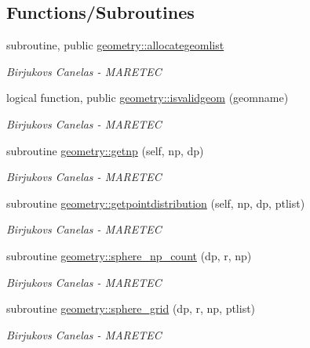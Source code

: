 \subsection*{Functions/\+Subroutines}
\begin{DoxyCompactItemize}
\item 
subroutine, public \hyperlink{namespacegeometry_a17652db20fde3f883b4fc778e0e6cdda}{geometry\+::allocategeomlist}
\begin{DoxyCompactList}\small\item\em Birjukovs Canelas -\/ M\+A\+R\+E\+T\+EC \end{DoxyCompactList}\item 
logical function, public \hyperlink{namespacegeometry_a56488a00edf7ba4e670ceffd5c36f13f}{geometry\+::isvalidgeom} (geomname)
\begin{DoxyCompactList}\small\item\em Birjukovs Canelas -\/ M\+A\+R\+E\+T\+EC \end{DoxyCompactList}\item 
subroutine \hyperlink{namespacegeometry_ad14d7800ac13b9a6722ac96b06ce94c9}{geometry\+::getnp} (self, np, dp)
\begin{DoxyCompactList}\small\item\em Birjukovs Canelas -\/ M\+A\+R\+E\+T\+EC \end{DoxyCompactList}\item 
subroutine \hyperlink{namespacegeometry_a726dae6e63f052138bd3346de439fbc4}{geometry\+::getpointdistribution} (self, np, dp, ptlist)
\begin{DoxyCompactList}\small\item\em Birjukovs Canelas -\/ M\+A\+R\+E\+T\+EC \end{DoxyCompactList}\item 
subroutine \hyperlink{namespacegeometry_a4f070ef95bffe3bbb21bd251ae5ca6c7}{geometry\+::sphere\+\_\+np\+\_\+count} (dp, r, np)
\begin{DoxyCompactList}\small\item\em Birjukovs Canelas -\/ M\+A\+R\+E\+T\+EC \end{DoxyCompactList}\item 
subroutine \hyperlink{namespacegeometry_a9629040285de7053d42f434333528702}{geometry\+::sphere\+\_\+grid} (dp, r, np, ptlist)
\begin{DoxyCompactList}\small\item\em Birjukovs Canelas -\/ M\+A\+R\+E\+T\+EC \end{DoxyCompactList}\item 

\end{DoxyCompactItemize}
